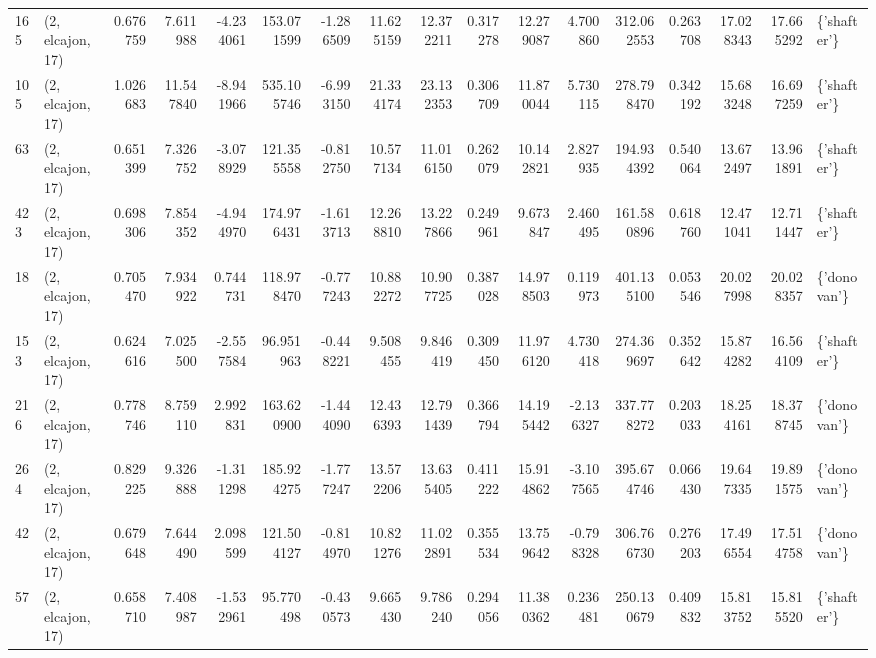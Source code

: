 \begin{tabular}{llrrrrrrrrrrrrrrl}
165 &  (2, elcajon, 17) &   0.676759 &   7.611988 &  -4.234061 &   153.071599 &  -1.286509 &  11.625159 &  12.372211 &  0.317278 &  12.279087 &   4.700860 &   312.062553 &   0.263708 &  17.028343 &  17.665292 &  \{'shafter'\} \\
105 &  (2, elcajon, 17) &   1.026683 &  11.547840 &  -8.941966 &   535.105746 &  -6.993150 &  21.334174 &  23.132353 &  0.306709 &  11.870044 &   5.730115 &   278.798470 &   0.342192 &  15.683248 &  16.697259 &  \{'shafter'\} \\
63  &  (2, elcajon, 17) &   0.651399 &   7.326752 &  -3.078929 &   121.355558 &  -0.812750 &  10.577134 &  11.016150 &  0.262079 &  10.142821 &   2.827935 &   194.934392 &   0.540064 &  13.672497 &  13.961891 &  \{'shafter'\} \\
423 &  (2, elcajon, 17) &   0.698306 &   7.854352 &  -4.944970 &   174.976431 &  -1.613713 &  12.268810 &  13.227866 &  0.249961 &   9.673847 &   2.460495 &   161.580896 &   0.618760 &  12.471041 &  12.711447 &  \{'shafter'\} \\
18  &  (2, elcajon, 17) &   0.705470 &   7.934922 &   0.744731 &   118.978470 &  -0.777243 &  10.882272 &  10.907725 &  0.387028 &  14.978503 &   0.119973 &   401.135100 &   0.053546 &  20.027998 &  20.028357 &  \{'donovan'\} \\
153 &  (2, elcajon, 17) &   0.624616 &   7.025500 &  -2.557584 &    96.951963 &  -0.448221 &   9.508455 &   9.846419 &  0.309450 &  11.976120 &   4.730418 &   274.369697 &   0.352642 &  15.874282 &  16.564109 &  \{'shafter'\} \\
216 &  (2, elcajon, 17) &   0.778746 &   8.759110 &   2.992831 &   163.620900 &  -1.444090 &  12.436393 &  12.791439 &  0.366794 &  14.195442 &  -2.136327 &   337.778272 &   0.203033 &  18.254161 &  18.378745 &  \{'donovan'\} \\
264 &  (2, elcajon, 17) &   0.829225 &   9.326888 &  -1.311298 &   185.924275 &  -1.777247 &  13.572206 &  13.635405 &  0.411222 &  15.914862 &  -3.107565 &   395.674746 &   0.066430 &  19.647335 &  19.891575 &  \{'donovan'\} \\
42  &  (2, elcajon, 17) &   0.679648 &   7.644490 &   2.098599 &   121.504127 &  -0.814970 &  10.821276 &  11.022891 &  0.355534 &  13.759642 &  -0.798328 &   306.766730 &   0.276203 &  17.496554 &  17.514758 &  \{'donovan'\} \\
57  &  (2, elcajon, 17) &   0.658710 &   7.408987 &  -1.532961 &    95.770498 &  -0.430573 &   9.665430 &   9.786240 &  0.294056 &  11.380362 &   0.236481 &   250.130679 &   0.409832 &  15.813752 &  15.815520 &  \{'shafter'\} \\

\end{tabular}
